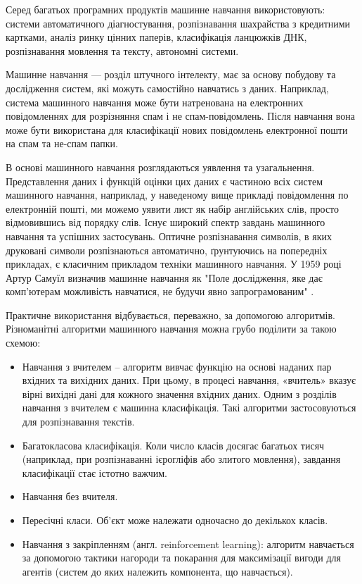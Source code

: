 Серед багатьох програмних продуктів машинне навчання використовують: системи автоматичного діагностування, розпізнавання шахрайства з кредитними картками, аналіз ринку цінних паперів, класифікація ланцюжків ДНК, розпізнавання мовлення та тексту, автономні системи.

Машинне навчання — розділ штучного інтелекту, має за основу побудову та дослідження систем, які можуть самостійно навчатись з даних. Наприклад, система машинного навчання може бути натренована на електронних повідомленнях для розрізняння спам і не спам-повідомлень. Після навчання вона може бути використана для класифікації нових повідомлень електронної пошти на спам та не-спам папки.

В основі машинного навчання розглядаються уявлення та узагальнення. Представлення даних і функцій оцінки цих даних є частиною всіх систем машинного навчання, наприклад, у наведеному вище прикладі повідомлення по електронній пошті, ми можемо уявити лист як набір англійських слів, просто відмовившись від порядку слів. Існує широкий спектр завдань машинного навчання та успішних застосувань. Оптичне розпізнавання символів, в яких друковані символи розпізнаються автоматично, ґрунтуючись на попередніх прикладах, є класичним прикладом техніки машинного навчання. У 1959 році Артур Самуїл визначив машинне навчання як "Поле дослідження, яке дає комп'ютерам можливість навчатися, не будучи явно запрограмованим" \cite{book:arthur_samuel}.

Практичне використання відбувається, переважно, за допомогою алгоритмів. Різноманітні алгоритми машинного навчання можна грубо поділити за такою схемою:
\begin{itemize}  
	\item Навчання з вчителем – алгоритм вивчає функцію на основі наданих пар вхідних та вихідних даних. При цьому, в процесі навчання, «вчитель» вказує вірні вихідні дані для кожного значення вхідних даних. Одним з розділів навчання з вчителем є машинна класифікація. Такі алгоритми застосовуються для розпізнавання текстів.
	\item Багатокласова класифікація. Коли число класів досягає багатьох тисяч (наприклад, при розпізнаванні ієрогліфів або злитого мовлення), завдання класифікації стає істотно важчим.
	\item Навчання без вчителя.
	\item Пересічні класи. Об'єкт може належати одночасно до декількох класів.
	\item Навчання з закріпленням (англ. reinforcement learning): алгоритм навчається за допомогою тактики нагороди та покарання для максимізації вигоди для агентів (систем до яких належить компонента, що навчається).
\end{itemize}

